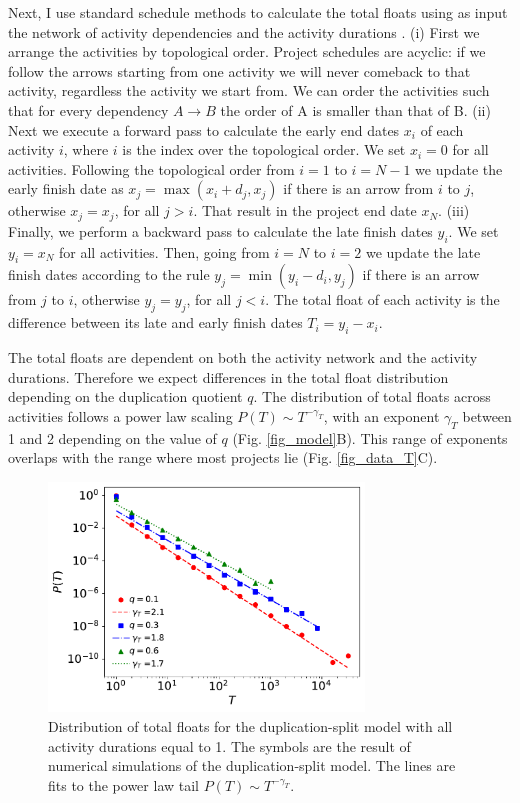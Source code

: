 \documentclass[11pt]{article}
\begin{document}
Next, I use standard schedule methods to calculate the total floats using as input the network of activity dependencies and the activity durations \cite{van13}. (i) First we arrange the activities by topological order. Project schedules are acyclic: if we follow the arrows starting from one activity we will never comeback to that activity, regardless the activity we start from. We can order the activities such that for every dependency $A\rightarrow B$ the order of A is smaller than that of B. (ii) Next we execute a forward pass to calculate the early end dates $x_i$ of each activity $i$, where $i$ is the index over the topological order. We set $x_i=0$ for all activities. Following the topological order from $i=1$ to $i=N-1$ we update the early finish date as $x_j = \max( x_i  + d_j, x_j)$ if there is an arrow from $i$ to $j$, otherwise  $x_j = x_j$, for all $j>i$. That result in the project end date $x_N$. (iii) Finally, we perform a backward pass to calculate the late finish dates $y_i$. We set $y_i=x_N$ for all activities. Then, going from $i=N$ to $i=2$ we update the late finish dates according to the rule $y_j = \min(y_i - d_i, y_j)$ if there is an arrow from $j$ to $i$, otherwise $y_j = y_j$, for all $j<i$. The total float of each activity is the difference between its late and early finish dates $T_i = y_i - x_i$. 

The total floats are dependent on both the activity network and the activity durations. Therefore we expect differences in the total float distribution depending on the duplication quotient $q$. The distribution of total floats across activities follows a power law scaling $P(T)\sim T^{-\gamma_T}$, with an exponent $\gamma_T$ between 1 and 2 depending on the value of $q$ (Fig. \ref{fig_model}B). This range of exponents overlaps with the range where most projects lie (Fig. \ref{fig_data_T}C).

\begin{figure}[t]
\begin{center}
\includegraphics[width=3.3in]{fig_model_d1}
\end{center}
\caption{Distribution of total floats for the duplication-split model with all activity durations equal to 1. The symbols are the result of numerical simulations of the duplication-split model. The lines are fits to the power law tail $P(T)\sim T^{-\gamma_T}$.}
\label{fig_model_d1}
\end{figure}
\end{document}
